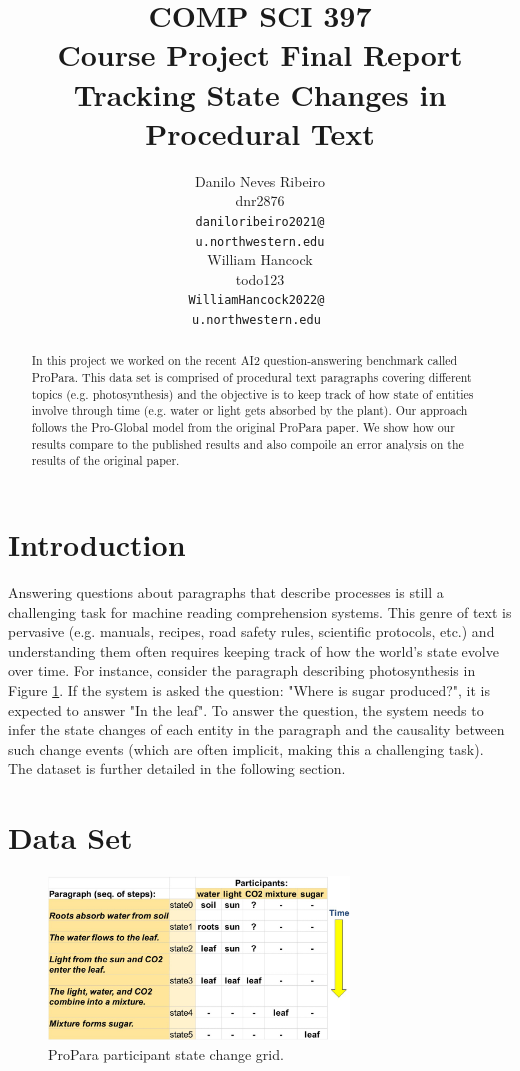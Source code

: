\documentclass[11pt,a4paper]{article}
\title{COMP SCI 397 \\
    Course Project Final Report \\
    Tracking State Changes in Procedural Text}
\author{Danilo Neves Ribeiro \\
  dnr2876 \\
  {\tt daniloribeiro2021@} \\
  {\tt u.northwestern.edu} \\\And
  William Hancock \\
  todo123 \\
  {\tt WilliamHancock2022@ } \\
  {\tt u.northwestern.edu } \\}
\date{}
\begin{document}
\maketitle
\begin{abstract}
  In this project we worked on the recent AI2 question-answering 
  benchmark called ProPara. This data set is comprised of procedural 
  text paragraphs covering different topics (e.g. photosynthesis) and 
  the objective is to keep track of how state of entities involve through 
  time (e.g. water or light gets absorbed by the plant). Our approach 
  follows the Pro-Global model from the original ProPara paper. We 
  show how our results compare to the published results and also 
  compoile an error analysis on the results of the original paper.
\end{abstract}

\section{Introduction}

Answering questions about paragraphs that describe processes is still 
a challenging task for machine reading comprehension systems. This 
genre of text is pervasive (e.g. manuals, recipes, road safety rules, 
scientific protocols, etc.) and understanding them often requires 
keeping track of how the world’s state evolve over time. For instance, 
consider the paragraph describing photosynthesis in Figure 
\ref{fig:participant-grid}. If the system is asked the question: 
"Where is sugar produced?", it is expected to answer "In the leaf". 
To answer the question, the system needs to infer the state changes 
of each entity in the paragraph and the causality between such change 
events (which are often implicit, making this a challenging task). The 
dataset is further detailed in the following section.

\section{Data Set}

\begin{figure}[h]
\includegraphics[width=8cm]{participant-grid-simple.JPG}
\caption{ProPara participant state change grid.}
\label{fig:participant-grid}
\end{figure}
\end{document}
